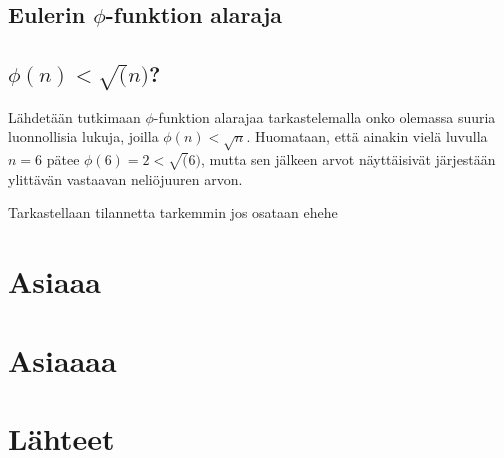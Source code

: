 \documentclass{article}
\theoremstyle{definition}
\begin{document}
\subsection{Eulerin $\phi$-funktion alaraja}

\subsection{$\phi(n) < \sqrt(n)$?}

Lähdetään tutkimaan $\phi$-funktion alarajaa tarkastelemalla onko olemassa suuria luonnollisia lukuja, joilla $\phi(n) < \sqrt{n}$. Huomataan, että ainakin vielä luvulla $n=6$ pätee $\phi(6)=2<\sqrt(6)$, mutta sen jälkeen arvot näyttäisivät järjestään ylittävän vastaavan neliöjuuren arvon.

Tarkastellaan tilannetta tarkemmin jos osataan ehehe

\section{Asiaaa}

\section{Asiaaaa}

\section{Lähteet}

\printbibliography[heading=none]
\end{document}
